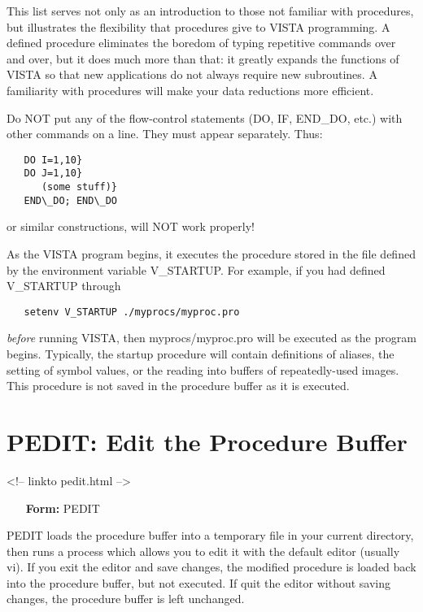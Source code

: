 This list serves not only as an introduction to those not familiar with
procedures, but illustrates the flexibility that procedures give to VISTA
programming.  A defined procedure eliminates the boredom of typing
repetitive commands over and over, but it does much more than that: it
greatly expands the functions of VISTA so that new applications do not
always require new subroutines.  A familiarity with procedures will make
your data reductions more efficient.

\newline
Do NOT put any of the flow-control statements (DO, IF, END\_DO, etc.) with
other commands on a line.  They must appear separately.  Thus:
\begin{verbatim}
   DO I=1,10}
   DO J=1,10}
      (some stuff)}
   END\_DO; END\_DO
\end{verbatim}
or similar constructions, will NOT work properly!

As the VISTA program begins, it executes the procedure stored in the file
defined by the environment variable V\_STARTUP.  For example, if you had
defined V\_STARTUP through
\begin{verbatim}
   setenv V_STARTUP ./myprocs/myproc.pro
\end{verbatim}
\textit{before} running VISTA, then myprocs/myproc.pro will be executed as the
program begins.  Typically, the startup procedure will contain definitions
of aliases, the setting of symbol values, or the reading into buffers of
repeatedly-used images.  This procedure is not saved in the procedure
buffer as it is executed.

\section{PEDIT: Edit the Procedure Buffer}
\begin{rawhtml}
<!-- linkto pedit.html -->
\end{rawhtml}

\begin{itemize}
  \item[\textbf{Form: } PEDIT\hfill]{}
\end{itemize}

PEDIT loads the procedure buffer into a temporary file in your current
directory, then runs a process which allows you to edit it with the default
editor (usually vi).  If you exit the editor and save changes, the modified
procedure is loaded back into the procedure buffer, but not executed.  If
quit the editor without saving changes, the procedure buffer is left
unchanged.

